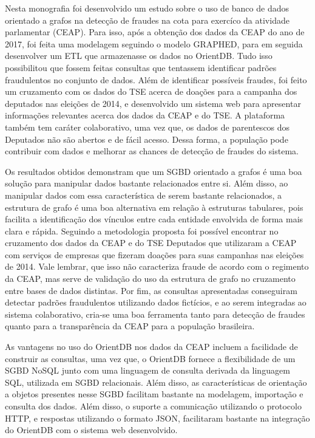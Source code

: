 Nesta monografia foi desenvolvido um estudo sobre o uso de banco de dados orientado a grafos na detecção de fraudes na cota para exercíco da atividade parlamentar (CEAP). Para isso, após a obtenção dos dados da CEAP do ano de 2017, foi feita uma modelagem seguindo o modelo GRAPHED, para em seguida desenvolver um ETL que armazenasse os dados no OrientDB. Tudo isso possibilitou que fossem feitas consultas que tentassem identificar padrões fraudulentos no conjunto de dados. Além de identificar possíveis fraudes, foi feito um cruzamento com os dados do TSE acerca de doações para a campanha dos deputados nas eleições de 2014, e desenvolvido um sistema web para apresentar informações relevantes acerca dos dados da CEAP e do TSE. A plataforma também tem caráter colaborativo, uma vez que, os dados de parentescos dos Deputados não são abertos e de fácil acesso. Dessa forma, a população pode contribuir com dados e melhorar as chances de detecção de fraudes do sistema.

Os resultados obtidos demonstram que um SGBD orientado a grafos é uma boa solução para manipular dados bastante relacionados entre si. Além disso, ao manipular dados com essa característica de serem bastante relacionados, a estrutura de grafo é uma boa alternativa em relação à estruturas tabulares, pois facilita a identificação dos vínculos entre cada entidade envolvida de forma mais clara e rápida. Seguindo a metodologia proposta foi possível encontrar no cruzamento dos dados da CEAP e do TSE Deputados que utilizaram a CEAP com serviços de empresas que fizeram doações para suas campanhas nas eleições de 2014. Vale lembrar, que isso não caracteriza fraude de acordo com o regimento da CEAP, mas serve de validação do uso da estrutura de grafo no cruzamento entre bases de dados distintas. Por fim, as consultas apresentadas conseguiram detectar padrões fraudulentos utilizando dados fictícios, e ao serem integradas ao sistema colaborativo, cria-se uma boa ferramenta tanto para detecção de fraudes quanto para a transparência da CEAP para a população brasileira.

As vantagens no uso do OrientDB nos dados da CEAP incluem a facilidade de construir as consultas, uma vez que, o OrientDB fornece a flexibilidade de um SGBD NoSQL junto com uma linguagem de consulta derivada da linguagem SQL, utilizada em SGBD relacionais. Além disso, as características de orientação a objetos presentes nesse SGBD facilitam bastante na modelagem, importação e consulta dos dados. Além disso, o suporte a comunicação utilizando o protocolo HTTP, e respostas utilizando o formato JSON, facilitaram bastante na integração do OrientDB com o sistema web desenvolvido.


